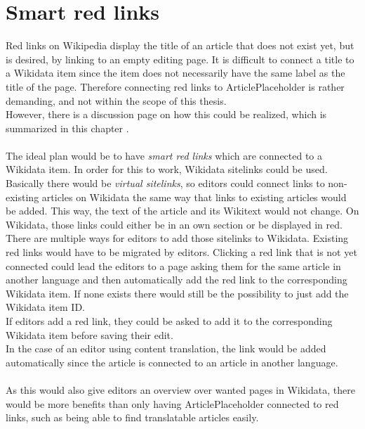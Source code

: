 \section{Smart red links}\label{sec:redLinks}
	Red links on Wikipedia display the title of an article that does not exist yet, but is desired, by linking to an empty editing page. It is difficult to connect a title to a Wikidata item since the item does not necessarily have the same label as the title of the page. Therefore connecting red links to ArticlePlaceholder is rather demanding, and not within the scope of this thesis. \\
	However, there is a discussion page on how this could be realized, which is summarized in this chapter \citep{wiki:22}. \\
	\\
	The ideal plan would be to have \textit{smart red links} which are connected to a Wikidata item. In order for this to work, Wikidata sitelinks could be used. Basically there would be \textit{virtual sitelinks}, so editors could connect links to non-existing articles on Wikidata the same way that links to existing articles would be added. This way, the text of the article and its Wikitext would not change. On Wikidata, those links could either be in an own section or be displayed in red. \\
	There are multiple ways for editors to add those sitelinks to Wikidata. Existing red links would have to be migrated by editors. Clicking a red link that is not yet connected could lead the editors to a page asking them for the same article in another language and then automatically add the red link to the corresponding Wikidata item. If none exists there would still be the possibility to just add the Wikidata item ID. \\
	If editors add a red link, they could be asked to add it to the corresponding Wikidata item before saving their edit. \\
	In the case of an editor using content translation, the link would be added automatically since the article is connected to an article in another language. \\
	\\
	As this would also give editors an overview over wanted pages in Wikidata, there would be more benefits than only having ArticlePlaceholder connected to red links, such as being able to find translatable articles easily.